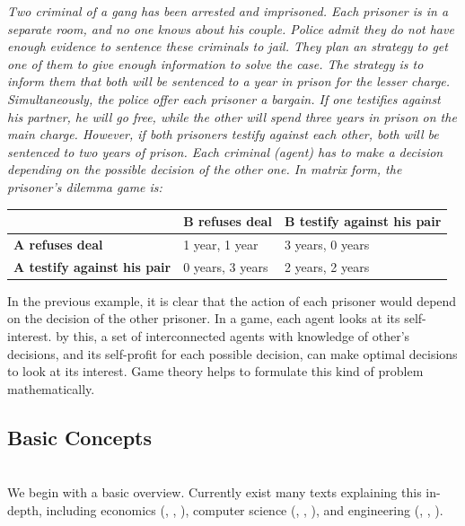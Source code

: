 \begin{example}

\textit{Two criminal of a gang has been arrested and imprisoned. Each prisoner is in a separate room, and no one knows about his couple. Police admit they do not have enough evidence to sentence these criminals to jail. They plan an strategy to get one of them to give enough information to solve the case. The strategy is to inform them that both will be sentenced to a year in prison for the lesser charge. Simultaneously, the police offer each prisoner a bargain. If one testifies against his partner, he will go free, while the other will spend three years in prison on the main charge. However, if both prisoners testify against each other, both will be sentenced to two years of prison. Each criminal (agent) has to make a decision depending on the possible decision of the other one. In matrix form, the prisoner's dilemma game is: 
}

\begin{table}[h!]
\centering
\begin{tabular}{l|l|l}
                                    & \textbf{B refuses deal} & \textbf{B testify against  his pair} \\ \hline
\textbf{A refuses deal}             & 1 year, 1 year          & 3 years, 0 years                     \\ \hline
\textbf{A testify against his pair} & 0 years, 3 years        & 2 years, 2 years                    
\end{tabular}
\end{table}
\end{example}


In the previous example, it is clear that the action of each prisoner would depend on the decision of the other prisoner. In a game, each agent looks at its self-interest. by this, a set of interconnected agents with knowledge of other's decisions, and its self-profit for each possible decision, can make optimal decisions to look at its interest. Game theory helps to formulate this kind of problem mathematically.


\subsection{Basic Concepts}
\\
We begin with a basic overview. Currently exist many texts explaining this in-depth, including economics (\cite{33t_GameTheory2}, \cite{5shamma_game}, \cite{6shamma_course}), computer science (\cite{7shamma_prediction}, \cite{29t_book}, \cite{9shamma_algorithmic}), and engineering (\cite{10shamma_dynamic}, \cite{11shamma_game}, \cite{12shamma_noncooperative}).
\\

